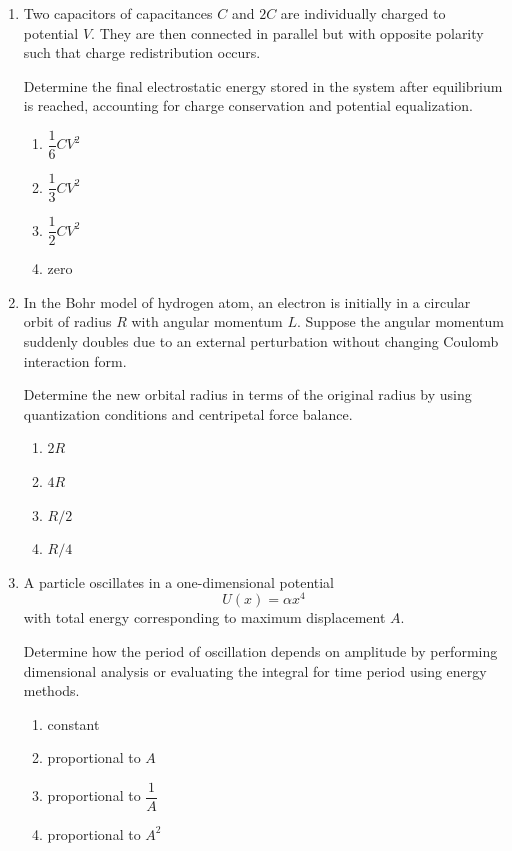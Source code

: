 \documentclass[12pt]{article}
\begin{document}
\begin{enumerate}
\item
Two capacitors of capacitances $C$ and $2C$ are individually charged to potential $V$. They are then connected in parallel but with opposite polarity such that charge redistribution occurs.

Determine the final electrostatic energy stored in the system after equilibrium is reached, accounting for charge conservation and potential equalization.

\begin{enumerate}
\item $\dfrac{1}{6}CV^2$
\item $\dfrac{1}{3}CV^2$
\item $\dfrac{1}{2}CV^2$
\item zero
\end{enumerate}

\item
In the Bohr model of hydrogen atom, an electron is initially in a circular orbit of radius $R$ with angular momentum $L$. Suppose the angular momentum suddenly doubles due to an external perturbation without changing Coulomb interaction form.

Determine the new orbital radius in terms of the original radius by using quantization conditions and centripetal force balance.

\begin{enumerate}
\item $2R$
\item $4R$
\item $R/2$
\item $R/4$
\end{enumerate}

\item
A particle oscillates in a one-dimensional potential
\[
U(x)=\alpha x^4
\]
with total energy corresponding to maximum displacement $A$.

Determine how the period of oscillation depends on amplitude by performing dimensional analysis or evaluating the integral for time period using energy methods.

\begin{enumerate}
\item constant
\item proportional to $A$
\item proportional to $\dfrac{1}{A}$
\item proportional to $A^2$
\end{enumerate}


\end{enumerate}
\end{document}
